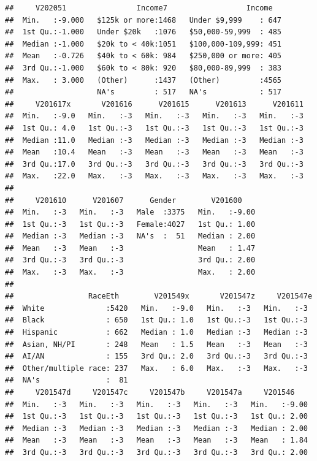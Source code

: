 \documentclass[
]{krantz}
\begin{document}
\begin{verbatim}
##     V202051                Income7                  Income    
##  Min.   :-9.000   $125k or more:1468   Under $9,999    : 647  
##  1st Qu.:-1.000   Under $20k   :1076   $50,000-59,999  : 485  
##  Median :-1.000   $20k to < 40k:1051   $100,000-109,999: 451  
##  Mean   :-0.726   $40k to < 60k: 984   $250,000 or more: 405  
##  3rd Qu.:-1.000   $60k to < 80k: 920   $80,000-89,999  : 383  
##  Max.   : 3.000   (Other)      :1437   (Other)         :4565  
##                   NA's         : 517   NA's            : 517  
##     V201617x       V201616      V201615      V201613      V201611  
##  Min.   :-9.0   Min.   :-3   Min.   :-3   Min.   :-3   Min.   :-3  
##  1st Qu.: 4.0   1st Qu.:-3   1st Qu.:-3   1st Qu.:-3   1st Qu.:-3  
##  Median :11.0   Median :-3   Median :-3   Median :-3   Median :-3  
##  Mean   :10.4   Mean   :-3   Mean   :-3   Mean   :-3   Mean   :-3  
##  3rd Qu.:17.0   3rd Qu.:-3   3rd Qu.:-3   3rd Qu.:-3   3rd Qu.:-3  
##  Max.   :22.0   Max.   :-3   Max.   :-3   Max.   :-3   Max.   :-3  
##                                                                    
##     V201610      V201607      Gender        V201600     
##  Min.   :-3   Min.   :-3   Male  :3375   Min.   :-9.00  
##  1st Qu.:-3   1st Qu.:-3   Female:4027   1st Qu.: 1.00  
##  Median :-3   Median :-3   NA's  :  51   Median : 2.00  
##  Mean   :-3   Mean   :-3                 Mean   : 1.47  
##  3rd Qu.:-3   3rd Qu.:-3                 3rd Qu.: 2.00  
##  Max.   :-3   Max.   :-3                 Max.   : 2.00  
##                                                         
##                 RaceEth        V201549x       V201547z     V201547e 
##  White              :5420   Min.   :-9.0   Min.   :-3   Min.   :-3  
##  Black              : 650   1st Qu.: 1.0   1st Qu.:-3   1st Qu.:-3  
##  Hispanic           : 662   Median : 1.0   Median :-3   Median :-3  
##  Asian, NH/PI       : 248   Mean   : 1.5   Mean   :-3   Mean   :-3  
##  AI/AN              : 155   3rd Qu.: 2.0   3rd Qu.:-3   3rd Qu.:-3  
##  Other/multiple race: 237   Max.   : 6.0   Max.   :-3   Max.   :-3  
##  NA's               :  81                                           
##     V201547d     V201547c     V201547b     V201547a     V201546     
##  Min.   :-3   Min.   :-3   Min.   :-3   Min.   :-3   Min.   :-9.00  
##  1st Qu.:-3   1st Qu.:-3   1st Qu.:-3   1st Qu.:-3   1st Qu.: 2.00  
##  Median :-3   Median :-3   Median :-3   Median :-3   Median : 2.00  
##  Mean   :-3   Mean   :-3   Mean   :-3   Mean   :-3   Mean   : 1.84  
##  3rd Qu.:-3   3rd Qu.:-3   3rd Qu.:-3   3rd Qu.:-3   3rd Qu.: 2.00  

\end{verbatim}
\end{document}
